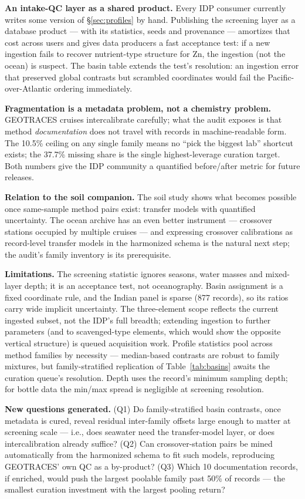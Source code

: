 \documentclass[11pt]{article}
\begin{document}
\textbf{An intake-QC layer as a shared product.} Every IDP consumer
currently writes some version of \S\ref{sec:profiles} by hand. Publishing
the screening layer as a database product --- with its statistics, seeds
and provenance --- amortizes that cost across users and gives data
producers a fast acceptance test: if a new ingestion fails to recover
nutrient-type structure for Zn, the ingestion (not the ocean) is suspect.
The basin table extends the test's resolution: an ingestion error that
preserved global contrasts but scrambled coordinates would fail the
Pacific-over-Atlantic ordering immediately.

\textbf{Fragmentation is a metadata problem, not a chemistry problem.}
GEOTRACES cruises intercalibrate carefully; what the audit exposes is that
method \emph{documentation} does not travel with records in
machine-readable form. The 10.5\% ceiling on any single family means no
``pick the biggest lab'' shortcut exists; the 37.7\% missing share is the
single highest-leverage curation target. Both numbers give the
IDP community a quantified before/after metric for future releases.

\textbf{Relation to the soil companion.} The soil study \cite{gga2026c}
shows what becomes possible once same-sample method pairs exist: transfer
models with quantified uncertainty. The ocean archive has an even better
instrument --- crossover stations occupied by multiple cruises --- and
expressing crossover calibrations as record-level transfer models in the
harmonized schema is the natural next step; the audit's family inventory is
its prerequisite.

\textbf{Limitations.}
\label{sec:limits}
The screening statistic ignores seasons, water masses and mixed-layer
depth; it is an acceptance test, not oceanography. Basin assignment is a
fixed coordinate rule, and the Indian panel is sparse (877 records), so its
ratios carry wide implicit uncertainty. The three-element scope reflects
the current ingested subset, not the IDP's full breadth; extending
ingestion to further parameters (and to scavenged-type elements, which
would show the opposite vertical structure) is queued acquisition work.
Profile statistics pool across method families by necessity ---
median-based contrasts are robust to family mixtures, but family-stratified
replication of Table~\ref{tab:basins} awaits the curation queue's
resolution. Depth uses the record's minimum sampling depth; for bottle data
the min/max spread is negligible at screening resolution.

\textbf{New questions generated.} (Q1) Do family-stratified basin
contrasts, once metadata is cured, reveal residual inter-family offsets
large enough to matter at screening scale --- i.e., does seawater need the
transfer-model layer, or does intercalibration already suffice? (Q2) Can
crossover-station pairs be mined automatically from the harmonized schema
to fit such models, reproducing GEOTRACES' own QC as a by-product? (Q3)
Which 10 documentation records, if enriched, would push the largest
poolable family past 50\% of records --- the smallest curation
investment with the largest pooling return?
\end{document}
